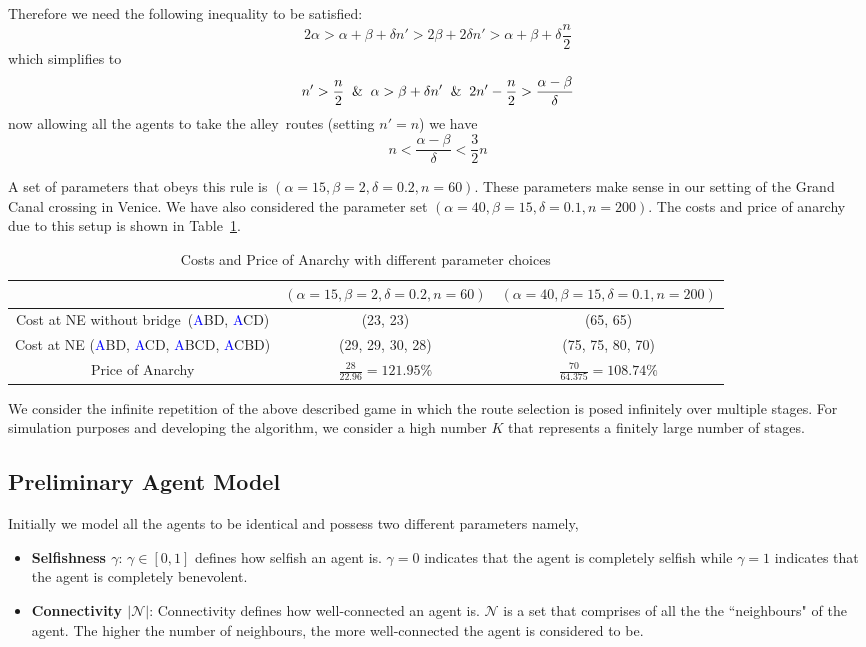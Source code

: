 \documentclass[11pt, letterpaper]{article}
\newcommand{\nodeA}{\textcolor{blue}{A}}
\newcommand{\nodeB}{\textcolor{orange!80!black}{B}}
\newcommand{\nodeC}{\textcolor{orange!80!black}{C}}
\newcommand{\nodeD}{\textcolor{green!70!black}{D}}
\newcommand{\pathalley}{\textcolor{red!40!brown}{\textsf{alley}}}
\newcommand{\pathbridge}{\textsf{bridge}}
\begin{document}
Therefore we need the following inequality to be satisfied:
$$ 2\alpha> \alpha+\beta+\delta n'> 2\beta+2\delta n'>\alpha+\beta+\delta \frac{n}{2}$$
which simplifies to $$n'>\frac{n}{2} \And \alpha>\beta+\delta n' \And 2n'-\frac{n}{2}>\frac{\alpha-\beta}{\delta}$$
now allowing all the agents to take the \pathalley~routes (setting $n'=n$) we have $$n<\frac{\alpha-\beta}{\delta}<\frac{3}{2}n$$

A set of parameters that obeys this rule is $(\alpha=15, \beta=2, \delta=0.2, n=60)$. These parameters make sense in our setting of the Grand Canal crossing in Venice. We have also considered the parameter set $(\alpha=40, \beta=15, \delta=0.1, n=200)$. The costs and price of anarchy due to this setup is shown in Table~\ref{tab:bpCostspoa}.

\begin{table}[htbp]
    \centering \small
    \begin{tabular}{|c|c|c|} \hline
         & $(\alpha=15, \beta=2, \delta=0.2, n=60)$ & $(\alpha=40, \beta=15, \delta=0.1, n=200)$ \\ \hline
        Cost at NE without \pathbridge~(\nodeA\nodeB\nodeD, \nodeA\nodeC\nodeD) & (23, 23) & (65, 65)\\
        Cost at NE (\nodeA\nodeB\nodeD, \nodeA\nodeC\nodeD, \nodeA\nodeB\nodeC\nodeD, \nodeA\nodeC\nodeB\nodeD) & (29, 29, 30, 28) & (75, 75, 80, 70) \\
        Price of Anarchy & $\frac{28}{22.96}=121.95\%$ & $\frac{70}{64.375}=108.74\%$ \\ \hline        
    \end{tabular}
    \caption{Costs and Price of Anarchy with different parameter choices}
    \label{tab:bpCostspoa}
\end{table}

We consider the infinite repetition of the above described game in which the route selection is posed infinitely over multiple stages. For simulation purposes and developing the algorithm, we consider a high number $K$ that represents a finitely large number of stages. 

\subsection{Preliminary Agent Model}\label{sub:PAM}
Initially we model all the agents to be identical and possess two different parameters namely,
\begin{itemize}
    \item \textbf{Selfishness $\gamma$}: $\gamma \in [0,1]$ defines how selfish an agent is. $\gamma = 0$ indicates that the agent is completely selfish while $\gamma = 1$ indicates that the agent is completely benevolent. 
    \item \textbf{Connectivity $|\mathcal{N}|$}: Connectivity defines how well-connected an agent is. $\mathcal{N}$ is a set that comprises of all the the ``neighbours" of the agent. The higher the number of neighbours, the more well-connected the agent is considered to be.
\end{itemize}
\end{document}
